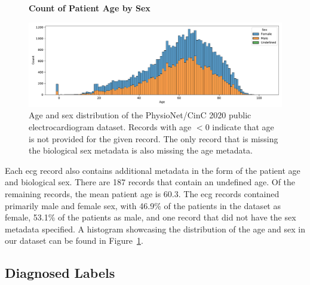 \documentclass[\main/thesis.tex]{subfiles}
\begin{document}
\begin{figure}[ht]
    \centering
    \textbf{Count of Patient Age by Sex}\par\medskip
    \includegraphics[width=14cm]{figure/age_sex_hist.pdf}
    \caption[Age and sex distribution of the PhysioNet/CinC 2020 public electrocardiogram dataset.]{Age and sex distribution of the PhysioNet/CinC 2020 public electrocardiogram dataset.
    Records with age $<0$ indicate that age is not provided for the given record. The only record that is missing the biological sex metadata is also missing the age metadata.}
    \label{fig:age_sex_hist}
\end{figure}

Each \gls{ecg} record also contains additional metadata in the form of the patient age and biological sex.
There are 187 records that contain an undefined age.
Of the remaining records, the mean patient age is 60.3.
The \gls{ecg} records contained primarily male and female sex, with 46.9\% of the patients in the dataset as female, 53.1\% of the patients as male, and one record that did not have the sex metadata specified.
A histogram showcasing the distribution of the age and sex in our dataset can be found in Figure~\ref{fig:age_sex_hist}.

\subsection{Diagnosed Labels}
\end{document}
